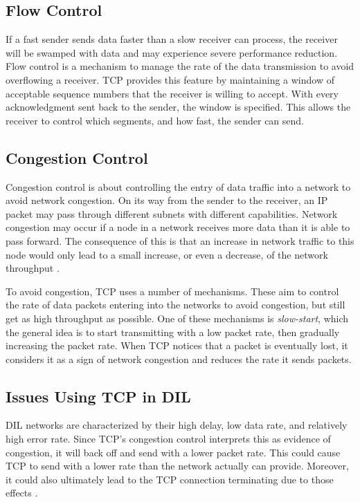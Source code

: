 \subsection{Flow Control}

If a fast sender sends data faster than a slow receiver can process, the
receiver will be swamped with data and may experience severe performance
reduction. Flow control is a mechanism to manage the rate of the data
transmission to avoid overflowing a receiver. TCP provides this feature by
maintaining a window of acceptable sequence numbers that the receiver is willing
to accept. With every acknowledgment sent back to the sender, the window is
specified. This allows the receiver to control which segments, and how fast, the
sender can send.

\subsection{Congestion Control}

Congestion control is about controlling the entry of data traffic into a network
to avoid network congestion. On its way from the sender to the receiver, an IP
packet may pass through different subnets with different capabilities. Network
congestion may occur if a node in a network receives more data than it is able
to pass forward. The consequence of this is that an increase in network traffic
to this node would only lead to a small increase, or even a decrease, of the
network throughput \cite{Al-Bahadili2012}.

To avoid congestion, TCP uses a number of mechanisms. These aim to control the
rate of data packets entering into the networks to avoid congestion, but still
get as high throughput as possible. One of these mechanisms is
\textit{slow-start}, which the general idea is to start transmitting with a low
packet rate, then gradually increasing the packet rate. When TCP notices that a
packet is eventually lost, it considers it as a sign of network congestion and
reduces the rate it sends packets.

\subsection{Issues Using TCP in DIL}
\label{section:tcp-problems}

DIL networks are characterized by their high delay, low data rate, and relatively
high error rate. Since TCP's congestion control interprets this as evidence of
congestion, it will back off and send with a lower packet rate. This could cause
TCP to send with a lower rate than the network actually can provide. Moreover,
it could also ultimately lead to the TCP connection terminating due to those
effects \cite{nato-disadvantaged-grids}.



